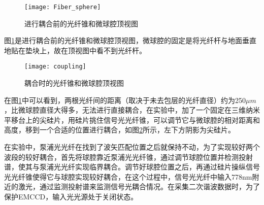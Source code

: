 \begin{figure}
\centering
\texttt{[image: Fiber\_sphere]}
\caption{进行耦合前的光纤锥和微球腔顶视图}
\label{pic:Fiber_sphere}
\end{figure}

图\ref{pic:Fiber_sphere}是进行耦合前的光纤锥和微球腔顶视图，微球腔的固定是将光纤杆与地面垂直地贴在垫块上，故在顶视图中看不到光纤杆。

\begin{figure}
\centering
\texttt{[image: coupling]}
\caption{耦合时的光纤锥和微球腔顶视图}
\label{pic:coupling}
\end{figure}

在图\ref{pic:Fiber_sphere}中可以看到，两根光纤间的距离（取决于未去包层的光纤直径）约为250$\mu m$，比微球腔直径大得多，无法进行直接耦合，在实验中，加了一个固定在三维纳米平移台上的尖硅片，用硅片挑住信号光光纤锥，可以调节它与微球腔的相对距离和高度，移到一个合适的位置进行耦合，如图\ref{pic:coupling}所示，左下方阴影为尖硅片。

在实验中，泵浦光光纤在找到了波矢匹配位置之后就保持不动，为了实现较好两个波段的较好耦合，首先将球腔靠近泵浦光光纤锥，通过调节球腔位置并检测投射谱，使其与泵浦光光纤实现临界耦合。调节好球腔位置之后，再通过硅片操纵信号光光纤锥使得它与球腔实现较好耦合，在这个过程中，信号光光纤中输入778nm附近的激光，通过监测投射谱来监测信号光耦合情况。在采集二次谐波数据时，为了保护EMCCD，输入光光源处于关闭状态。
